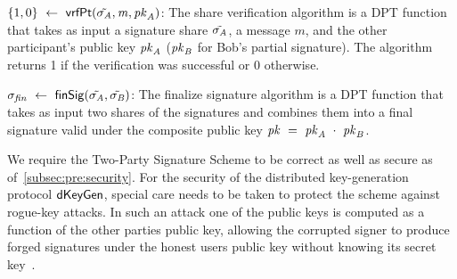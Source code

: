 \begin{definition}
\begin{asparaitem}
        \item $\{1,0\} ~\leftarrow~ \mathsf{vrfPt}(\tilde{\sigma_{\mathit{A}}}, \mathit{m}, \mathit{pk}_{\mathit{A}})$: The share verification algorithm is a DPT function that takes as input a signature share $\tilde{\sigma_{\mathit{A}}}$, a message $m$, and the other participant's public key $\mathit{pk}_{\mathit{A}}$ ($\mathit{pk}_{\mathit{B}}$ for Bob's partial signature).
        The algorithm returns 1 if the verification was successful or 0 otherwise.

        \item $\sigma_{\mathit{fin}} ~\leftarrow~ \mathsf{finSig}(\tilde{\sigma_{\mathit{A}}}, \tilde{\sigma_{\mathit{B}}})$: The finalize signature algorithm is a DPT function that takes as input two shares of the signatures and combines them into a final signature valid under the composite public key $\mathit{pk} ~=~ \mathit{pk}_{\mathit{A}} ~\cdot~ \mathit{pk}_{\mathit{B}}$.

    \end{asparaitem}

\end{definition}

We require the Two-Party Signature Scheme to be correct as well as secure as of~\cref{subsec:pre:security}.
For the security of the distributed key-generation protocol $\mathsf{dKeyGen}$, special care needs to be taken to protect the scheme against rogue-key attacks.
In such an attack one of the public keys is computed as a function of the other parties public key, allowing the corrupted signer to produce forged signatures under the honest users public key without knowing its secret key~\cite{maxwell2019simple}.


